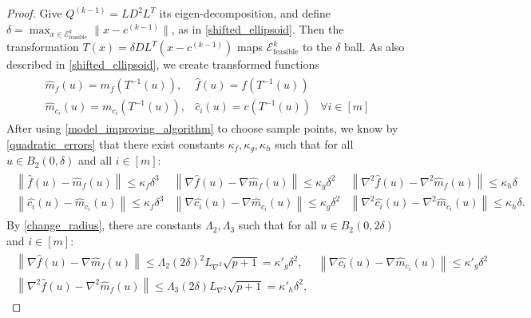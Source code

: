 \documentclass{article}
\theoremstyle{case}
\numberwithin{theorem}{subsection}
\newcommand{\liphess}{{L_{\nabla^2}}}
\newcommand{\unshiftedellipsoid}{{\mathcal E^k_{\textrm{feasible}}}}
\newcommand{\qkmo}{{Q^{(k-1)}}}
\newcommand{\ckmo}{{c^{(k-1)}}}
\begin{document}
\begin{proof}
Give $\qkmo = LD^2L^T$ its eigen-decomposition, and define $\delta = \max_{x \in \unshiftedellipsoid} \|x - \ckmo\|$, as in \cref{shifted_ellipsoid}.
Then the transformation $T(x) = \delta D L^T(x - \ckmo)$ maps $\unshiftedellipsoid$ to the $\delta$ ball.
As also described in \cref{shifted_ellipsoid}, we create transformed functions
\begin{align*}
\begin{array}{ccc}
\hat {m}_f(u) = m_f(T^{-1}(u)),&  \hat f (u) = f(T^{-1}(u)) &\\
\hat {m}_{c_i}(u) = m_{c_i}(T^{-1}(u)), &  \hat c_i (u) = c(T^{-1}(u))& \forall i \in [m]
\end{array}
\end{align*}
After using \cref{model_improving_algorithm} to choose sample points, we know by \cref{quadratic_errors} that
there exist constants $\kappa_f, \kappa_g, \kappa_h$ such that for all $u \in B_2(0, \delta)$ and all $i \in [m]$:
\begin{align*}
\begin{array}{ccc}
\left\| \hat {f}\left(u\right) -  \hat{m}_f\left(u\right) \right\|\le \kappa_f \delta^3 &
\left\|\nabla \hat {f}\left(u\right) - \nabla \hat{m}_f\left(u\right) \right\|\le \kappa_g \delta^2 &
\left\|\nabla^2 \hat {f}\left(u\right) - \nabla^2 \hat{m}_f\left(u\right) \right\|\le \kappa_h \delta \\
\left\| \hat {{c_i}}\left(u\right) -  \hat{m}_{c_i}\left(u\right) \right\|\le \kappa_f \delta^3 &
\left\|\nabla \hat {{c_i}}\left(u\right) - \nabla \hat{m}_{c_i}\left(u\right) \right\|\le \kappa_g \delta^2 &
\left\|\nabla^2 \hat {{c_i}}\left(u\right) - \nabla^2 \hat{m}_{c_i}\left(u\right) \right\|\le \kappa_h \delta.
\end{array}
\end{align*}
By \cref{change_radius}, there are constants $\Lambda_2, \Lambda_3$ such that for all $u \in B_2(0, 2\delta)$ and $i \in [m]$:
\begin{align*}
\begin{array}{cc}
\left\|\nabla \hat {f}\left(u\right) - \nabla \hat{m}_f\left(u\right) \right\|\le \Lambda_2 \left(2\delta\right)^2 \liphess \sqrt{p+1} = {\kappa'}_g\delta^2, &
\left\|\nabla \hat {c_i}\left(u\right) - \nabla \hat{m}_{c_i}\left(u\right) \right\|\le {\kappa'}_g\delta^2 \\
\left\|\nabla^2 \hat {f}\left(u\right) - \nabla^2 \hat{m}_f\left(u\right) \right\|\le \Lambda_3 \left(2\delta\right) \liphess \sqrt{p+1} = {\kappa'}_h\delta^2, &

\end{array}
\end{align*}
\end{proof}
\end{document}
